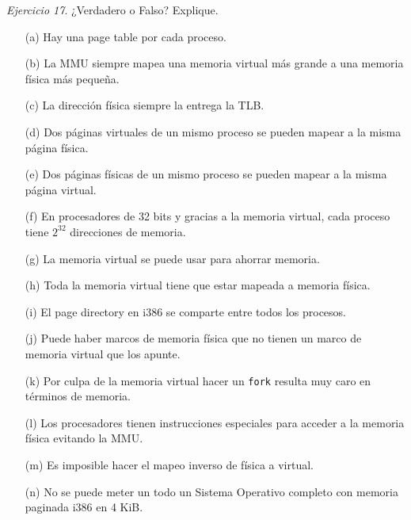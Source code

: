 \documentclass[12pt]{article}
\begin{document}
\noindent \textit{Ejercicio 17}. ¿Verdadero o Falso? Explique.
\begin{itemize}
    \item[(a)] Hay una page table por cada proceso.
    \item[(b)] La MMU siempre mapea una memoria virtual más grande a una memoria física más pequeña. 
    \item[(c)] La dirección física siempre la entrega la TLB. 
    \item[(d)] Dos páginas virtuales de un mismo proceso se pueden mapear a la misma página física. 
    \item[(e)] Dos páginas físicas de un mismo proceso se pueden mapear a la misma página virtual.
    \item[(f)] En procesadores de 32 bits y gracias a la memoria virtual, cada proceso tiene $2^{32}$ direcciones de memoria.
    \item[(g)] La memoria virtual se puede usar para ahorrar memoria.
    \item[(h)] Toda la memoria virtual tiene que estar mapeada a memoria física.
    \item[(i)] El page directory en i386 se comparte entre todos los procesos.
    \item[(j)] Puede haber marcos de memoria física que no tienen un marco de memoria virtual que los apunte. 
    \item[(k)] Por culpa de la memoria virtual hacer un \texttt{fork} resulta muy caro en términos de memoria.
    \item[(l)] Los procesadores tienen instrucciones especiales para acceder a la memoria física evitando la MMU. 
    \item[(m)] Es imposible hacer el mapeo inverso de física a virtual.
    \item[(n)] No se puede meter un todo un Sistema Operativo completo con memoria paginada i386 en 4 KiB.
\end{itemize}
\end{document}
